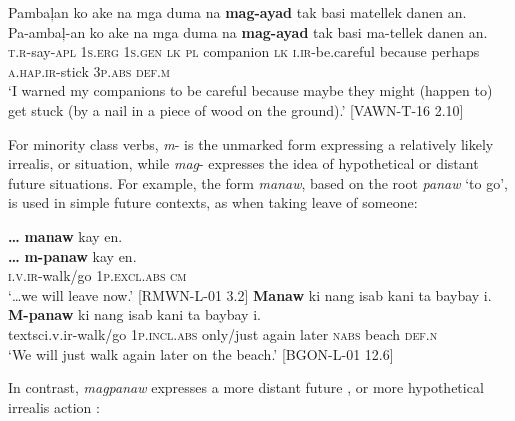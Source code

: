 \ea
\label{bkm:Ref392932747}
Pambaļan  ko  ake  na  mga  duma  na  \textbf{mag-ayad} tak  basi  matellek  danen  an. \\\smallskip
 \gll Pa-ambaļ-an  ko  ake  na  mga  duma  na  \textbf{mag-ayad} tak  basi  ma-tellek  danen  an. \\
\textsc{t.r}-say-\textsc{apl} 1\textsc{s.erg} 1\textsc{s.gen}  \textsc{lk}  \textsc{pl} companion \textsc{lk} \textsc{i.ir}-be.careful because  perhaps  \textsc{a.hap.ir}-stick  3\textsc{p.abs}  \textsc{def.m} \\
\glt `I warned my companions to be careful because maybe they might (happen to) get stuck (by a nail in a piece of wood on the ground).’ [VAWN-T-16 2.10]
\z

For minority class verbs, \textit{m}- is the unmarked form expressing a relatively likely irrealis, or  situation, while \textit{mag}- expresses the idea of hypothetical or distant future situations. For example, the form \textit{manaw}, based on the root \textit{panaw} ‘to go’, is used in simple future contexts, as when taking leave of someone:

\ea
\textbf{…} \textbf{manaw}  kay  en. \\\smallskip
 \gll \textbf{…} \textbf{m-panaw}  kay  en. \\
 {} \textsc{i.v.ir}-walk/go  1\textsc{p.excl.abs}  \textsc{cm} \\
\glt ‘…we will leave now.’ [RMWN-L-01 3.2]
\z
\ea
\textbf{Manaw}  ki  nang  isab  kani  ta  baybay  i. \\\smallskip
 \gll \textbf{M-panaw}  ki  nang  isab  kani  ta  baybay  i. \\
textsc{i.v.ir}-walk/go 1\textsc{p.incl.abs} only/just  again  later  \textsc{nabs}  beach  \textsc{def.n} \\
\glt ‘We will just walk again later on the beach.’ [BGON-L-01 12.6]
\z

In contrast, \textit{magpanaw} expresses a more distant future , or more hypothetical irrealis action :

